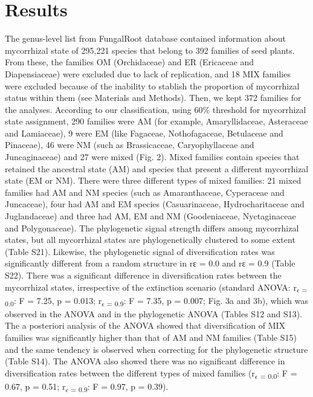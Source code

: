 \documentclass[12pt,]{article}
\begin{document}
\hypertarget{results}{%
\section{Results}\label{results}}

The genus-level list from FungalRoot database contained information
about mycorrhizal state of 295,221 species that belong to 392 families
of seed plants. From these, the families OM (Orchidaceae) and ER
(Ericaceae and Diapensiaceae) were excluded due to lack of replication,
and 18 MIX families were excluded because of the inability to stablish
the proportion of mycorrhizal status within them (see Materials and
Methods). Then, we kept 372 families for the analyses. According to our
classification, using 60\% threshold for mycorrhizal state assignment,
290 families were AM (for example, Amaryllidaceae, Asteraceae and
Lamiaceae), 9 were EM (like Fagaceae, Nothofagaceae, Betulaceae and
Pinaceae), 46 were NM (such as Brassicaceae, Caryophyllaceae and
Juncaginaceae) and 27 were mixed (Fig. 2). Mixed families contain
species that retained the ancestral state (AM) and species that present
a different mycorrhizal state (EM or NM). There were three different
types of mixed families: 21 mixed families had AM and NM species (such
as Amaranthaceae, Cyperaceae and Juncaceae), four had AM and EM species
(Casuarinaceae, Hydrocharitaceae and Juglandaceae) and three had AM, EM
and NM (Goodeniaceae, Nyctaginaceae and Polygonaceae). The phylogenetic
signal strength differs among mycorrhizal states, but all mycorrhizal
states are phylogenetically clustered to some extent (Table S21).
Likewise, the phylogenetic signal of diversification rates was
significantly different from a random structure in rɛ = 0.0 and rɛ = 0.9
(Table S22). There was a significant difference in diversification rates
between the mycorrhizal states, irrespective of the extinction scenario
(standard ANOVA: r\textsubscript{$\epsilon$ = 0.0}: F = 7.25, p = 0.013;
r\textsubscript{$\epsilon$ = 0.9}: F = 7.35, p = 0.007; Fig. 3a and 3b),
which was observed in the ANOVA and in the phylogenetic ANOVA (Tables
S12 and S13). The a posteriori analysis of the ANOVA showed that
diversification of MIX families was significantly higher than that of AM
and NM families (Table S15) and the same tendency is observed when
correcting for the phylogenetic structure (Table S14). The ANOVA also
showed there was no significant difference in diversification rates
between the different types of mixed families
(r\textsubscript{$\epsilon$ = 0.0}: F = 0.67, p = 0.51;
r\textsubscript{$\epsilon$ = 0.9}: F = 0.97, p = 0.39).
\end{document}
